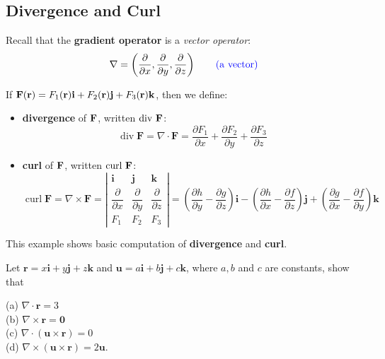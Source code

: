 \begin{spacing}{1.3}
    \newpage
    \section{Divergence and Curl}

    Recall that the {\bf gradient operator} is a {\it vector operator}:
    $$\nabla =\left(\frac{\partial}{\partial x}, \frac{\partial}{\partial y}, \frac{\partial}{\partial z}\right)\qquad {\color{blue}\rm (a\ vector)}$$

    If ${\bf F} ({\bf r})=F_1({\bf r}){\bf i} +F_2({\bf r}) {\bf j} +F_3({\bf r}) {\bf k}$, then we define: 
    \begin{itemize}
        \item {\bf divergence} of ${\bf F}$, written ${\rm div\ } {\bf F}$:   
        $$\boxed{
        \operatorname{div} \mathbf{F}=\nabla \cdot \mathbf{F}=\frac{\partial F_1}{\partial x}+\frac{\partial F_2}{\partial y}+\frac{\partial F_3}{\partial z}
        }$$
        \item {\bf curl} of ${\bf F}$, written ${\rm curl\ } {\bf F}$: 
        $$\boxed{
        \operatorname{curl} \mathbf{F}=\nabla \times \mathbf{F}=\left|\begin{array}{ccc}
        \mathbf{i} & \mathbf{j} & \mathbf{k} \\
        \dfrac{\partial}{\partial x} & \dfrac{\partial}{\partial y} & \dfrac{\partial}{\partial z} \\
        F_1 & F_2 & F_3
        \end{array}\right|=\left(\frac{\partial h}{\partial y}-\frac{\partial g}{\partial z}\right) \mathbf{i}-\left(\frac{\partial h}{\partial x}-\frac{\partial f}{\partial z}\right) \mathbf{j}+\left(\frac{\partial g}{\partial x}-\frac{\partial f}{\partial y}\right) \mathbf{k}
        }$$
    \end{itemize}

    \newpage
    {\blue This example shows basic computation of {\bf divergence} and {\bf curl}.}

    \eg Let $\mathbf{r}=x \mathbf{i}+y \mathbf{j}+z \mathbf{k}$ and $\mathbf{u}=a \mathbf{i}+b \mathbf{j}+c \mathbf{k}$, where $a, b$ and $c$ are constants, show that

    (a) $\nabla \cdot \mathbf{r}=3$\\
    (b) $\nabla \times \mathbf{r}=\mathbf{0}$\\
    (c) $\nabla \cdot(\mathbf{u} \times \mathbf{r})=0$\\
    (d) $\nabla \times(\mathbf{u} \times \mathbf{r})=2 \mathbf{u}$.


\end{spacing}
